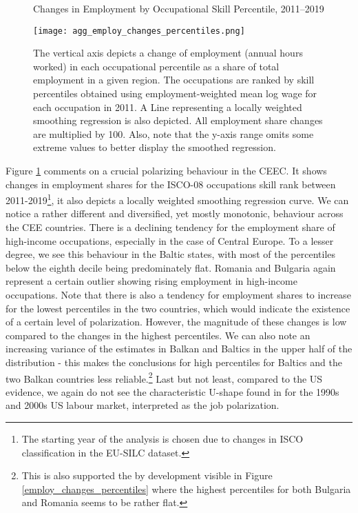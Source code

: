 \documentclass[11pt]{article}
\begin{document}
\begin{figure}[!htbp]%
    \centering
    \caption{Changes in Employment by Occupational Skill Percentile, 2011–2019}
    {\texttt{[image: agg\_employ\_changes\_percentiles.png]} }
    \label{agg_employ_changes_percentiles}
    \caption*{\footnotesize The vertical axis depicts a change of employment (annual hours worked) in each occupational percentile as a share of total employment in a given region. The occupations are ranked by skill percentiles obtained using employment-weighted mean log wage for each occupation in 2011. A Line representing a locally weighted smoothing regression is also depicted. All employment share changes are multiplied by 100. Also, note that the y-axis range omits some extreme values to better display the smoothed regression.   }
\end{figure}
Figure \ref{agg_employ_changes_percentiles} comments on a crucial polarizing behaviour in the CEEC. It shows changes in employment shares for the ISCO-08 occupations skill rank between 2011-2019\footnote{The starting year of the analysis is chosen due to changes in ISCO classification in the EU-SILC dataset.}, it also depicts a locally weighted smoothing regression curve. We can notice a rather different and diversified, yet mostly monotonic, behaviour across the CEE countries. There is a declining tendency for the employment share of high-income occupations, especially in the case of Central Europe. To a lesser degree, we see this behaviour in the Baltic states, with most of the percentiles below the eighth decile being predominately flat. Romania and Bulgaria again represent a certain outlier showing rising employment in high-income occupations. Note that there is also a tendency for employment shares to increase for the lowest percentiles in the two countries, which would indicate the existence of a certain level of polarization. However, the magnitude of these changes is low compared to the changes in the highest percentiles. We can also note an increasing variance of the estimates in Balkan and Baltics in the upper half of the distribution - this makes the conclusions for high percentiles for Baltics and the two Balkan countries less reliable.\footnote{This is also supported the by development visible in Figure \ref{employ_changes_percentiles} where the highest percentiles for both Bulgaria and Romania seems to be rather flat.}
Last but not least, compared to the US evidence, we again do not see the characteristic U-shape found in \citet{acemoglu2012does} for the 1990s and 2000s US labour market, interpreted as the job polarization.
\end{document}
